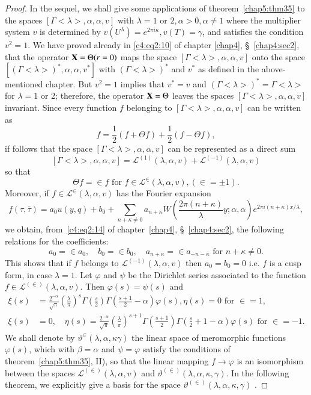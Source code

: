 \begin{proof}
In the sequel, we shall give some applications of theorem~\ref{chap5:thm35} to the
spaces $[\Gamma<\lambda>,\alpha, \alpha, v]$ with $\lambda=1$ or $2,
\alpha>0, \alpha\neq 1$ where the multiplier system $v$ is determined
by $v(U^{\lambda})=e^{2\pi i \kappa}, v(T)=\gamma$, and satisfies the
condition $v^2=1$. We have proved already in \eqref{c4:eq2:10} of chapter
\pageoriginale \ref{chap4}, \S~\ref{chap4:sec2}, that the operator $\mathbf{X}=\Theta(r=0)$ maps the
space $[\Gamma<\lambda>, \alpha,\alpha,v]$ onto the space
$[(\Gamma<\lambda>)^{\ast}, \alpha,\alpha,v^{\ast}]$ with
$(\Gamma<\lambda>)^{\ast}$ and $v^{\ast}$ as defined in the
above-mentioned chapter. But $v^2=1$ implies that $v^{\ast}=v$ and
$(\Gamma<\lambda>)^{\ast} = \Gamma<\lambda>$ for $\lambda=1$ or 2;
therefore, the operator $\mathbf{X}=\Theta$ leaves the spaces
$[\Gamma<\lambda>, \alpha, \alpha,v]$ invariant. Since every function
$f$ belonging to $[\Gamma<\lambda>, \alpha,\alpha,v]$ can be written
as 
$$
f=\frac{1}{2} (f+\Theta f) + \frac{1}{2} (f-\Theta f),
$$
if follows that the space $[\Gamma<\lambda>,\alpha,\alpha, v]$ can be
represented as a direct sum 
$$
[\Gamma<\lambda>, \alpha,\alpha, v] =
\mathscr{L}^{(1)}(\lambda,\alpha,v) + \mathscr{L}^{(-1)}(\lambda,
\alpha,v) 
$$
so that 
$$
\Theta f = \in f \text{ for } f \in
\mathscr{L}^{\in} (\lambda, \alpha, v), (\in = \pm
1). 
$$
Moreover, if $f\in \mathscr{L}^{\in}(\lambda,
\alpha,v)$ has the Fourier expansion
$$
f(\tau,\bar{\tau}) = a_0u(y,q) + b_0 + \sum_{n+\kappa\neq 0}
a_{n+\kappa} W(\frac{2\pi(n+\kappa)}{\lambda} y;\alpha,\alpha) e^{2\pi
i(n+\kappa)x/\lambda},
$$
we obtain, from~\eqref{c4:eq2:14} of chapter~\ref{chap4}, 
\S~\ref{chap4:sec2}, the following relations for
the coefficients:
$$
a_0 = \in a_0, \quad b_0 = \in b_0, \quad a_{n+\kappa}
= \in a_{-n-\kappa} \text{ for } n+\kappa \neq 0.
$$
This shows that if $f$ belongs to $\mathscr{L}^{(-1)} (\lambda,
\alpha, v)$ then $a_0=b_0=0$ i.e. $f$ is a cusp form, in case $\lambda
=1$. Let $\varphi$ and $\psi$ be the Dirichlet series associated to
the function $f\in \mathscr{L}^{(\in)}(\lambda,
\alpha, v)$. Then $\varphi(s)=\psi(s)$ and 
\begin{align*}
\xi(s) & = \frac{2^{-\alpha}}{\surd\pi} (\frac{\lambda}{\pi})^s
\Gamma(\frac{s}{2}) \Gamma (\frac{s+1}{2}-\alpha) \varphi(s),
\eta(s)=0 \text{ for } \in =1,\\
\xi(s) & = 0, \quad \eta(s) = \frac{2^{-\alpha}}{\surd \pi}
(\frac{\lambda}{\pi})^{s+1} \Gamma(\frac{s+1}{2})
\Gamma(\frac{s}{2}+1-\alpha) \varphi(s) \text{ for } \in = -1.
\end{align*}
We shall \pageoriginale denote by $\vartheta^{\in}(\lambda,
\alpha, \kappa \gamma)$ the linear space of meromorphic functions
$\varphi(s)$, which with $\beta =\alpha$ and $\psi=\varphi$ satisfy
the conditions of theorem~\ref{chap5:thm35}, II), so that the linear mapping $f\to
\varphi$ is an isomorphism between the spaces
$\mathscr{L}^{(\in)} (\lambda, \alpha,v)$ and
$\vartheta^{(\in)}(\lambda, \alpha, \kappa, \gamma)$. In the
following theorem, we explicitly give a basis for the space
$\vartheta^{(\in)}(\lambda, \alpha,\kappa, \gamma)$ .
\end{proof}

